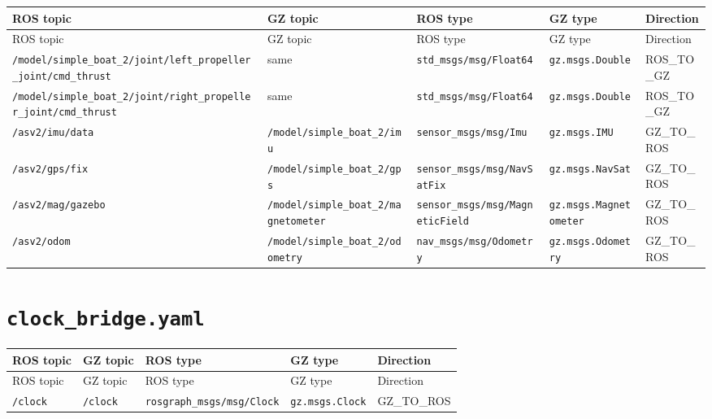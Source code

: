 \begin{center}
\small
\begin{longtable}{@{}p{2.1cm}p{2.1cm}p{2.1cm}p{2.1cm}p{3.2cm}@{}}
\toprule
ROS topic & GZ topic & ROS type & GZ type & Direction \\
\midrule
\endfirsthead
\toprule
ROS topic & GZ topic & ROS type & GZ type & Direction \\
\midrule
\endhead
\texttt{/model/simple\_boat\_2/joint/left\_propeller\_joint/cmd\_thrust} & same & \texttt{std\_msgs/msg/Float64} & \texttt{gz.msgs.Double} & ROS\_TO\_GZ \\
\texttt{/model/simple\_boat\_2/joint/right\_propeller\_joint/cmd\_thrust} & same & \texttt{std\_msgs/msg/Float64} & \texttt{gz.msgs.Double} & ROS\_TO\_GZ \\
\texttt{/asv2/imu/data} & \texttt{/model/simple\_boat\_2/imu} & \texttt{sensor\_msgs/msg/Imu} & \texttt{gz.msgs.IMU} & GZ\_TO\_ROS \\
\texttt{/asv2/gps/fix} & \texttt{/model/simple\_boat\_2/gps} & \texttt{sensor\_msgs/msg/NavSatFix} & \texttt{gz.msgs.NavSat} & GZ\_TO\_ROS \\
\texttt{/asv2/mag/gazebo} & \texttt{/model/simple\_boat\_2/magnetometer} & \texttt{sensor\_msgs/msg/MagneticField} & \texttt{gz.msgs.Magnetometer} & GZ\_TO\_ROS \\
\texttt{/asv2/odom} & \texttt{/model/simple\_boat\_2/odometry} & \texttt{nav\_msgs/msg/Odometry} & \texttt{gz.msgs.Odometry} & GZ\_TO\_ROS \\
\bottomrule
\end{longtable}
\end{center}


\section{\texttt{clock\_bridge.yaml}}


\begin{center}
\small
\begin{longtable}{@{}p{2.1cm}p{2.1cm}p{2.1cm}p{2.1cm}p{3.2cm}@{}}
\toprule
ROS topic & GZ topic & ROS type & GZ type & Direction \\
\midrule
\endfirsthead
\toprule
ROS topic & GZ topic & ROS type & GZ type & Direction \\
\midrule
\endhead
\texttt{/clock} & \texttt{/clock} & \texttt{rosgraph\_msgs/msg/Clock} & \texttt{gz.msgs.Clock} & GZ\_TO\_ROS \\
\bottomrule
\end{longtable}
\end{center}


